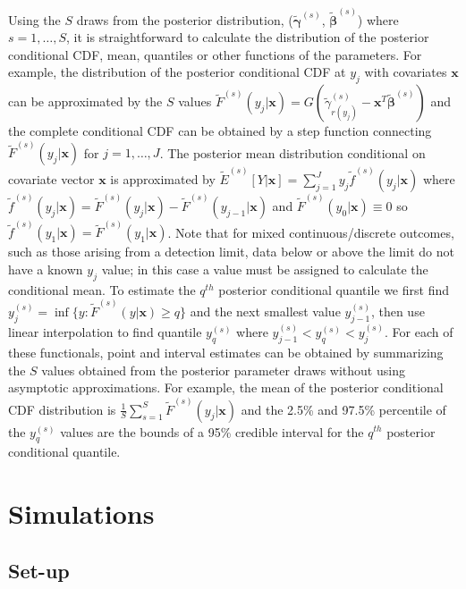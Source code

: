 \documentclass[
]{article}
\begin{document}
Using the \(S\) draws from the posterior distribution, (\(\tilde{\boldsymbol{\gamma}}^{(s)}\), \(\tilde{\boldsymbol{\beta}}^{(s)}\)) where \(s=1,\ldots,S\), it is straightforward to calculate the distribution of the posterior conditional CDF, mean, quantiles or other functions of the parameters. For example, the distribution of the posterior conditional CDF at \(y_j\) with covariates \(\boldsymbol{x}\) can be approximated by the \(S\) values \(\tilde{F}^{(s)}(y_j|\boldsymbol{x})=G(\tilde{\gamma}_{r(y_j)}^{(s)}-\boldsymbol{x}^{T}\tilde{\boldsymbol{\beta}}^{(s)})\) and the complete conditional CDF can be obtained by a step function connecting \(\tilde{F}^{(s)}(y_j|\boldsymbol{x})\) for \(j=1,\ldots,J\). The posterior mean distribution conditional on covariate vector \(\boldsymbol{x}\) is approximated by \(\tilde{E}^{(s)}[Y|\boldsymbol{x}]=\sum_{j=1}^{J}y_j\tilde{f}^{(s)}(y_j|\boldsymbol{x})\) where \(\tilde{f}^{(s)}(y_j|\boldsymbol{x})=\tilde{F}^{(s)}(y_j|\boldsymbol{x})-\tilde{F}^{(s)}(y_{j-1}|\boldsymbol{x})\) and \(\tilde{F}^{(s)}(y_0|\boldsymbol{x}) \equiv 0\) so \(\tilde{f}^{(s)}(y_1|\boldsymbol{x})=\tilde{F}^{(s)}(y_1|\boldsymbol{x})\). Note that for mixed continuous/discrete outcomes, such as those arising from a detection limit, data below or above the limit do not have a known \(y_j\) value; in this case a value must be assigned to calculate the conditional mean. To estimate the \(q^{th}\) posterior conditional quantile we first find \(y_j^{(s)}=\inf\{y:\tilde{F}^{(s)}(y|\boldsymbol{x})\ge q\}\) and the next smallest value \(y_{j-1}^{(s)}\), then use linear interpolation to find quantile \(y_q^{(s)}\) where \(y_{j-1}^{(s)}<y_q^{(s)}<y_j^{(s)}\). For each of these functionals, point and interval estimates can be obtained by summarizing the \(S\) values obtained from the posterior parameter draws without using asymptotic approximations. For example, the mean of the posterior conditional CDF distribution is \(\frac{1}{S}\sum_{s=1}^S\tilde{F}^{(s)}(y_j|\boldsymbol{x})\) and the 2.5\% and 97.5\% percentile of the \(y_q^{(s)}\) values are the bounds of a 95\% credible interval for the \(q^{th}\) posterior conditional quantile.

\hypertarget{simulations}{%
\section{Simulations}\label{simulations}}

\hypertarget{set-up}{%
\subsection{Set-up}\label{set-up}}
\end{document}
